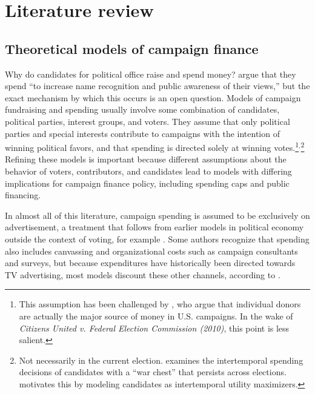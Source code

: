 \documentclass{article}
\begin{document}
\section{Literature review}

\subsection{Theoretical models of campaign finance}

Why do candidates for political office raise and spend money? \cite{coleman2000congressional} argue that they spend ``to increase name recognition and public awareness of their views,'' but the exact mechanism by which this occurs is an open question. Models of campaign fundraising and spending usually involve some combination of candidates, political parties, interest groups, and voters. They assume that only political parties and special interests contribute to campaigns with the intention of winning political favors, and that spending is directed solely at winning votes.\footnote{ This assumption has been challenged by \cite{ansolabehere2003there}, who argue that individual donors are actually the major source of money in U.S. campaigns. In the wake of \textit{Citizens United v. Federal Election Commission (2010)}, this point is less salient.}$^,$\footnote{ Not necessarily in the current election. \cite{goodliffe2001effect} examines the intertemporal spending decisions of candidates with a ``war chest'' that persists across elections. \cite{milyo2001candidates} motivates this by modeling candidates as intertemporal utility maximizers.} Refining these models is important because different assumptions about the behavior of voters, contributors, and candidates lead to models with differing implications for campaign finance policy, including spending caps and public financing. 

In almost all of this literature, campaign spending is assumed to be exclusively on advertisement, a treatment that follows from earlier models in political economy outside the context of voting, for example \cite{kihlstrom1984advertising}. Some authors recognize that spending also includes canvassing and organizational costs such as campaign consultants and surveys, but because expenditures have historically been directed towards TV advertising, most models discount these other channels, according to \cite{prat2004rational}.
\end{document}
